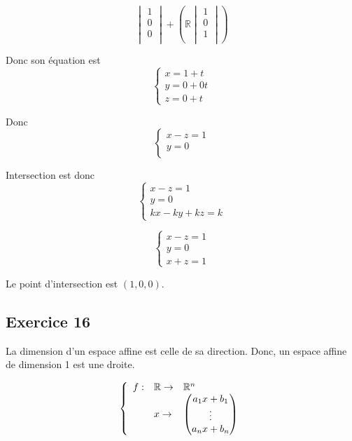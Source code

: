\documentclass[]{book}
\theoremstyle{definition}
\newcommand{\bb}[1]{\mathbb{#1}}
\newcommand{\R}{\bb{R}}
\begin{document}
$$
\begin{vmatrix}
    1 \\
    0 \\
    0 \\
\end{vmatrix}
+(\R
    \begin{vmatrix}
        1 \\
        0 \\
        1 \\
    \end{vmatrix}
)
$$

Donc son \'equation est 
$$
\left\{ 
    \begin{array}{l}
        x = 1 + t\\
        y = 0 + 0t\\
        z = 0 + t
    \end{array}
\right.
$$

Donc
$$
\left\{ 
    \begin{array}{l}
        x - z = 1 \\
        y = 0 \\
    \end{array}
\right.
$$

Intersection est donc
$$
\left\{ 
    \begin{array}{l}
        x - z = 1 \\
        y = 0 \\
        kx - ky + kz = k
    \end{array}
\right.
$$

$$
\left\{ 
    \begin{array}{l}
        x - z = 1 \\
        y = 0 \\
        x  + z = 1
    \end{array}
\right.
$$

Le point d'intersection est $(1,0,0)$.


\subsection*{Exercice 16}
La dimension d’un espace affine est celle de sa direction. Donc, un espace affine de dimension 1 est une droite.

$$
\left\{
\begin{array} {l l l}
    f: & \R \to & \R^n \\
     & x \to &\begin{pmatrix} a_1x + b_1 \\ \vdots \\ a_n x + b_n \end{pmatrix}
\end{array}
\right.
$$
\end{document}
